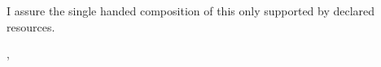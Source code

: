 \thispagestyle{empty}
\vspace*{0.8\textheight}
\noindent
I assure the single handed composition of this \MakeLowercase{\getDoctype{}} only supported by declared resources.

\vspace{15mm}
\noindent
\getSubmissionLocation{}, \getSubmissionDate{} \hspace{4.5cm} \getAuthor{}

\cleardoublepage{}
